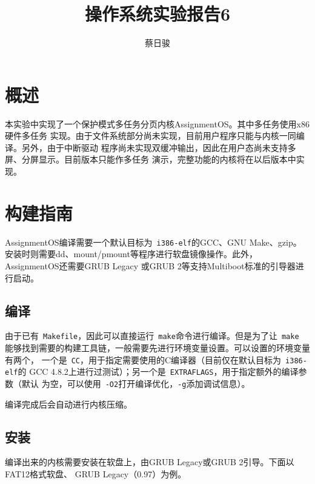 \documentclass[a4paper, adobefonts]{ctexart}
\title{操作系统实验报告6}
\author{蔡日骏\quad12348003}
\begin{document}
\maketitle
\tableofcontents

\section{概述}
本实验中实现了一个保护模式多任务分页内核AssignmentOS。其中多任务使用x86硬件多任务
实现。由于文件系统部分尚未实现，目前用户程序只能与内核一同编译。另外，由于中断驱动
程序尚未实现双缓冲输出，因此在用户态尚未支持多屏、分屏显示。目前版本只能作多任务
演示，完整功能的内核将在以后版本中实现。

\section{构建指南}
AssignmentOS编译需要一个默认目标为~\verb|i386-elf|的GCC、GNU Make、gzip。
安装时则需要dd、mount/pmount等程序进行软盘镜像操作。此外，AssignmentOS还需要GRUB Legacy
或GRUB 2等支持Multiboot标准的引导器进行启动。

\subsection{编译}
由于已有~\verb|Makefile|，因此可以直接运行~\verb|make|命令进行编译。但是为了让~\verb|make|
能够找到需要的构建工具链，一般需要先进行环境变量设置。可以设置的环境变量有两个，
一个是~\verb|CC|，用于指定需要使用的C编译器（目前仅在默认目标为~\verb|i386-elf|的
GCC 4.8.2上进行过测试）；另一个是~\verb|EXTRAFLAGS|，用于指定额外的编译参数（默认
为空，可以使用~\verb|-O2|打开编译优化，\verb|-g|添加调试信息）。

编译完成后会自动进行内核压缩。

\subsection{安装}
编译出来的内核需要安装在软盘上，由GRUB Legacy或GRUB 2引导。下面以FAT12格式软盘、
GRUB Legacy（0.97）为例。
\end{document}
